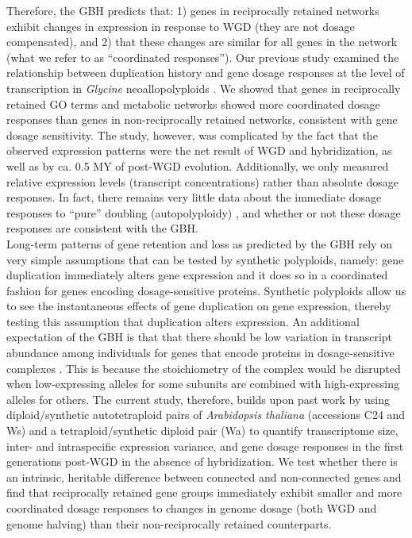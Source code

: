 \documentclass[11pt]{article}
\begin{document}
Therefore, the GBH predicts that: 1) genes in reciprocally retained networks exhibit changes in expression in response to WGD (they are not dosage compensated), and 2) that these changes are similar for all genes in the network (what we refer to as ``coordinated responses''). Our previous study examined the relationship between duplication history and gene dosage responses at the level of transcription in \textit{Glycine} neoallopolyploids \citep{coate2016}.
We showed that genes in reciprocally retained GO terms and metabolic networks showed more coordinated dosage responses than genes in non-reciprocally retained networks, consistent with gene dosage sensitivity.
The \cite{coate2016} study, however, was complicated by the fact that the observed expression patterns were the net result of WGD and hybridization, as well as by ca. 0.5 MY of post-WGD evolution.
Additionally, we only measured relative expression levels (transcript concentrations) rather than absolute dosage responses.
In fact, there remains very little data about the immediate dosage responses to ``pure'' doubling (autopolyploidy) \citep{spoelhof2017, visger2019}, and whether or not these dosage responses are consistent with the GBH.\\

Long-term patterns of gene retention and loss as predicted by the GBH rely on very simple assumptions that can be tested by synthetic polyploids, namely: gene duplication immediately alters gene expression and it does so in a coordinated fashion for genes encoding dosage-sensitive proteins.
Synthetic polyploids allow us to see the instantaneous effects of gene duplication on gene expression, thereby testing this assumption that duplication alters expression.
An additional expectation of the GBH is that that there should be low variation in transcript abundance among individuals for genes that encode proteins in dosage-sensitive complexes \citep{coate2016}. This is because the stoichiometry of the complex would be disrupted when low-expressing alleles for some subunits are combined with high-expressing alleles for others.
The current study, therefore, builds upon past work by using diploid/synthetic autotetraploid pairs of \textit{Arabidopsis thaliana} (accessions C24 and Ws) and a tetraploid/synthetic diploid pair (Wa) to quantify transcriptome size, inter- and intraspecific expression variance, and gene dosage responses in the first generations post-WGD in the absence of hybridization.
We test whether there is an intrinsic, heritable difference between connected and non-connected genes and find that reciprocally retained gene groups immediately exhibit smaller and more coordinated dosage responses to changes in genome dosage (both WGD and genome halving) than their non-reciprocally retained counterparts.\\
\end{document}

